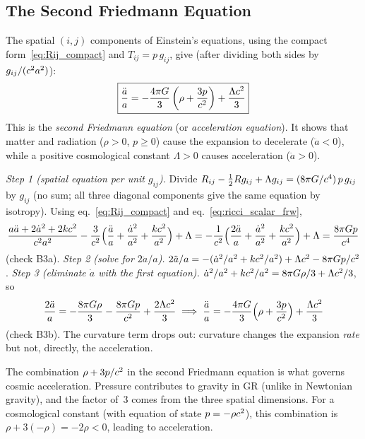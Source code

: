 \subsection{The Second Friedmann Equation}
\label{sec:friedmann_2}

The spatial $(i,j)$ components of Einstein's equations, using the
compact form~\eqref{eq:Rij_compact} and $T_{ij} = p\, g_{ij}$, give
(after dividing both sides by $g_{ij}/(c^2 a^2)$):
\begin{equation}
    \boxed{
    \frac{\ddot{a}}{a}
    = -\frac{4\pi G}{3}
    \left(\rho + \frac{3p}{c^2}\right)
    + \frac{\Lambda c^2}{3}
    }
    \label{eq:friedmann_2}
\end{equation}
This is the \emph{second Friedmann equation} (or \emph{acceleration
equation}).  It shows that matter and radiation ($\rho > 0$, $p \geq 0$)
cause the expansion to decelerate ($\ddot{a} < 0$), while a
positive cosmological constant $\Lambda > 0$ causes acceleration
($\ddot{a} > 0$).


\begin{derivation}
\textit{Step 1 (spatial equation per unit $g_{ij}$).}  Divide
$R_{ij} - \tfrac12 R g_{ij} + \Lambda g_{ij} = (8\pi G/c^4)\,p\,g_{ij}$
by $g_{ij}$ (no sum; all three diagonal components give the same equation by
isotropy).  Using eq.~\eqref{eq:Rij_compact} and eq.~\eqref{eq:ricci_scalar_frw},
\[
  \frac{a\ddot a + 2\dot a^2 + 2kc^2}{c^2a^2}
  - \frac{3}{c^2}\Bigl(\frac{\ddot a}{a} + \frac{\dot a^2}{a^2}
  + \frac{kc^2}{a^2}\Bigr) + \Lambda
  = -\frac{1}{c^2}\Bigl(\frac{2\ddot a}{a} + \frac{\dot a^2}{a^2}
  + \frac{kc^2}{a^2}\Bigr) + \Lambda
  = \frac{8\pi G p}{c^4}
\]
(check B3a).  \textit{Step 2 (solve for $2\ddot a/a$).}
$2\ddot a/a = -(\dot a^2/a^2 + kc^2/a^2) + \Lambda c^2
- 8\pi G p/c^2$.
\textit{Step 3 (eliminate $\dot a$ with the first equation).}
$\dot a^2/a^2 + kc^2/a^2 = 8\pi G\rho/3 + \Lambda c^2/3$, so
\[
  \frac{2\ddot a}{a} = -\frac{8\pi G\rho}{3} - \frac{8\pi G p}{c^2}
  + \frac{2\Lambda c^2}{3}
  \;\Longrightarrow\;
  \frac{\ddot a}{a} = -\frac{4\pi G}{3}\Bigl(\rho + \frac{3p}{c^2}\Bigr)
  + \frac{\Lambda c^2}{3}
\]
(check B3b).  The curvature term drops out: curvature changes the expansion
\emph{rate} but not, directly, the acceleration.
\end{derivation}
\begin{remark}
The combination $\rho + 3p/c^2$ in the second Friedmann
equation is what governs cosmic acceleration.  Pressure
contributes to gravity in GR (unlike in Newtonian gravity), and the
factor of~3 comes from the three spatial dimensions.  For a cosmological
constant (with equation of state $p = -\rho c^2$), this
combination is $\rho + 3(-\rho) = -2\rho < 0$, leading to acceleration.
\end{remark}

